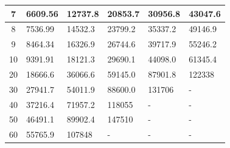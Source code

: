 \begin{table}[htp]
\begin{tabular}{|c|l|l|l|l|l|}
7                                                                          & 6609.56                              & 12737.8                               & 20853.7                               & 30956.8                               & 43047.6                               \\ \hline
8                                                                          & 7536.99                              & 14532.3                               & 23799.2                               & 35337.2                               & 49146.9                               \\ \hline
9                                                                          & 8464.34                              & 16326.9                               & 26744.6                               & 39717.9                               & 55246.2                               \\ \hline
10                                                                         & 9391.91                              & 18121.3                               & 29690.1                               & 44098.0                               & 61345.4                               \\ \hline
20                                                                         & 18666.6                              & 36066.6                               & 59145.0                               & 87901.8                               & 122338                                \\ \hline
30                                                                         & 27941.7                              & 54011.9                               & 88600.0                               & 131706                                & -                                     \\ \hline
40                                                                         & 37216.4                              & 71957.2                               & 118055                                & -                                     & -                                     \\ \hline
50                                                                         & 46491.1                              & 89902.4                               & 147510                                & -                                     & -                                     \\ \hline
60                                                                         & 55765.9                              & 107848                                & -                                     & -                                     & -                                     \\ \hline

\end{tabular}
\end{table}
